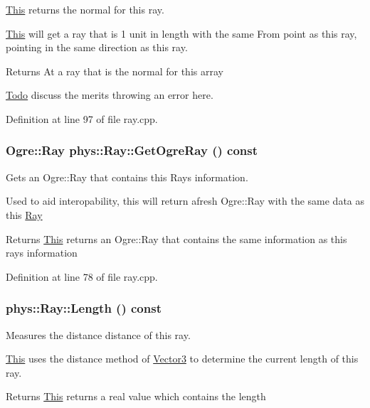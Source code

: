 \hyperlink{structThis}{This} returns the normal for this ray. 

\hyperlink{structThis}{This} will get a ray that is 1 unit in length with the same From point as this ray, pointing in the same direction as this ray. \begin{DoxyReturn}{Returns}
At a ray that is the normal for this array 
\end{DoxyReturn}


\begin{Desc}
\item[\hyperlink{todo__todo000020}{Todo}]discuss the merits throwing an error here. \end{Desc}




Definition at line 97 of file ray.cpp.

\hypertarget{classphys_1_1Ray_a0c29b1a55f42ff60d224f16cc0910cdb}{
\subsubsection[{GetOgreRay}]{\setlength{\rightskip}{0pt plus 5cm}Ogre::Ray phys::Ray::GetOgreRay () const}}
\label{df/d57/classphys_1_1Ray_a0c29b1a55f42ff60d224f16cc0910cdb}


Gets an Ogre::Ray that contains this Rays information. 

Used to aid interopability, this will return afresh Ogre::Ray with the same data as this \hyperlink{classphys_1_1Ray}{Ray} \begin{DoxyReturn}{Returns}
\hyperlink{structThis}{This} returns an Ogre::Ray that contains the same information as this rays information 
\end{DoxyReturn}


Definition at line 78 of file ray.cpp.

\hypertarget{classphys_1_1Ray_add544025fcd6d1cdcfed3c0413b3701b}{
\subsubsection[{Length}]{ phys::Ray::Length () const}}
\label{df/d57/classphys_1_1Ray_add544025fcd6d1cdcfed3c0413b3701b}


Measures the distance distance of this ray. 

\hyperlink{structThis}{This} uses the distance method of \hyperlink{classphys_1_1Vector3}{Vector3} to determine the current length of this ray. \begin{DoxyReturn}{Returns}
\hyperlink{structThis}{This} returns a real value which contains the length 
\end{DoxyReturn}


